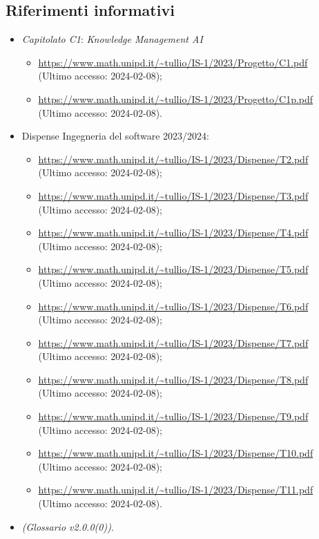 \documentclass[10pt, a4paper]{article}
\begin{document}
    \subsection{Riferimenti informativi}
    \begin{itemize}
        \item \textit{Capitolato C1}: \textit{Knowledge Management AI}
        \begin{itemize}
            \item \url{https://www.math.unipd.it/~tullio/IS-1/2023/Progetto/C1.pdf}\\
            (Ultimo accesso: 2024-02-08);
            \item \url{https://www.math.unipd.it/~tullio/IS-1/2023/Progetto/C1p.pdf}\\
            (Ultimo accesso: 2024-02-08).
        \end{itemize}
        \item Dispense Ingegneria del software 2023/2024:
        \begin{itemize}
            \item \url{https://www.math.unipd.it/~tullio/IS-1/2023/Dispense/T2.pdf}\\
            (Ultimo accesso: 2024-02-08);
            \item \url{https://www.math.unipd.it/~tullio/IS-1/2023/Dispense/T3.pdf}\\
            (Ultimo accesso: 2024-02-08);
            \item \url{https://www.math.unipd.it/~tullio/IS-1/2023/Dispense/T4.pdf}\\
            (Ultimo accesso: 2024-02-08);
            \item \url{https://www.math.unipd.it/~tullio/IS-1/2023/Dispense/T5.pdf}\\
            (Ultimo accesso: 2024-02-08);
            \item \url{https://www.math.unipd.it/~tullio/IS-1/2023/Dispense/T6.pdf}\\
            (Ultimo accesso: 2024-02-08);
            \item \url{https://www.math.unipd.it/~tullio/IS-1/2023/Dispense/T7.pdf}\\
            (Ultimo accesso: 2024-02-08);
            \item \url{https://www.math.unipd.it/~tullio/IS-1/2023/Dispense/T8.pdf}\\
            (Ultimo accesso: 2024-02-08);
            \item \url{https://www.math.unipd.it/~tullio/IS-1/2023/Dispense/T9.pdf}\\
            (Ultimo accesso: 2024-02-08);
            \item \url{https://www.math.unipd.it/~tullio/IS-1/2023/Dispense/T10.pdf}\\
            (Ultimo accesso: 2024-02-08);
            \item \url{https://www.math.unipd.it/~tullio/IS-1/2023/Dispense/T11.pdf}\\
            (Ultimo accesso: 2024-02-08).
        \end{itemize}
        \item \textit{(Glossario v2.0.0(0))}.
        

\end{itemize}
\end{document}
